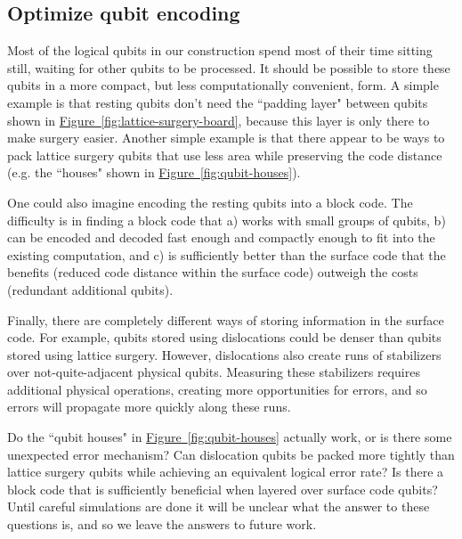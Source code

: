 \documentclass[superscriptaddress,notitlepage,longbibliography]{revtex4-1}
\theoremstyle{definition}
\theoremstyle{definition}
\newcommand{\fig}[1]{\hyperref[fig:#1]{Figure~\ref*{fig:#1}}}
\begin{document}
\subsection{Optimize qubit encoding}

Most of the logical qubits in our construction spend most of their time sitting still, waiting for other qubits to be processed.
It should be possible to store these qubits in a more compact, but less computationally convenient, form.
A simple example is that resting qubits don't need the ``padding layer" between qubits shown in \fig{lattice-surgery-board}, because this layer is only there to make surgery easier.
Another simple example is that there appear to be ways to pack lattice surgery qubits that use less area while preserving the code distance (e.g. the ``houses" shown in \fig{qubit-houses}).

One could also imagine encoding the resting qubits into a block code.
The difficulty is in finding a block code that a) works with small groups of qubits, b) can be encoded and decoded fast enough and compactly enough to fit into the existing computation, and c) is sufficiently better than the surface code that the benefits (reduced code distance within the surface code) outweigh the costs (redundant additional qubits).

Finally, there are completely different ways of storing information in the surface code.
For example, qubits stored using dislocations \cite{hastings2014dislocations} could be denser than qubits stored using lattice surgery.
However, dislocations also create runs of stabilizers over not-quite-adjacent physical qubits.
Measuring these stabilizers requires additional physical operations, creating more opportunities for errors, and so errors will propagate more quickly along these runs.

Do the ``qubit houses" in \fig{qubit-houses} actually work, or is there some unexpected error mechanism?
Can dislocation qubits be packed more tightly than lattice surgery qubits while achieving an equivalent logical error rate?
Is there a block code that is sufficiently beneficial when layered over surface code qubits?
Until careful simulations are done it will be unclear what the answer to these questions is, and so we leave the answers to future work.
\end{document}
